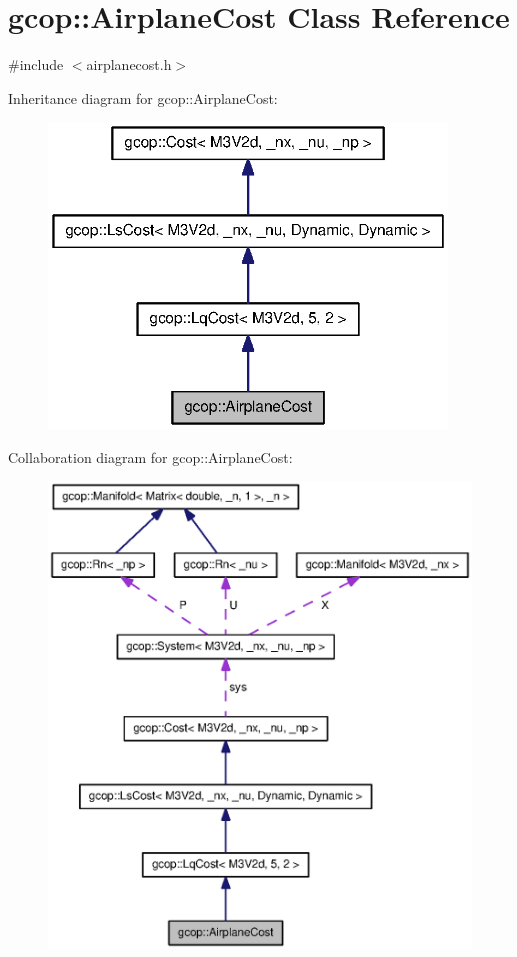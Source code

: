 \section{gcop\-:\-:\-Airplane\-Cost \-Class \-Reference}
\label{classgcop_1_1AirplaneCost}


{\ttfamily \#include $<$airplanecost.\-h$>$}



\-Inheritance diagram for gcop\-:\-:\-Airplane\-Cost\-:\nopagebreak
\begin{figure}[H]
\begin{center}
\leavevmode
\includegraphics[width=300pt]{classgcop_1_1AirplaneCost__inherit__graph}
\end{center}
\end{figure}


\-Collaboration diagram for gcop\-:\-:\-Airplane\-Cost\-:\nopagebreak
\begin{figure}[H]
\begin{center}
\leavevmode
\includegraphics[width=350pt]{classgcop_1_1AirplaneCost__coll__graph}
\end{center}
\end{figure}
